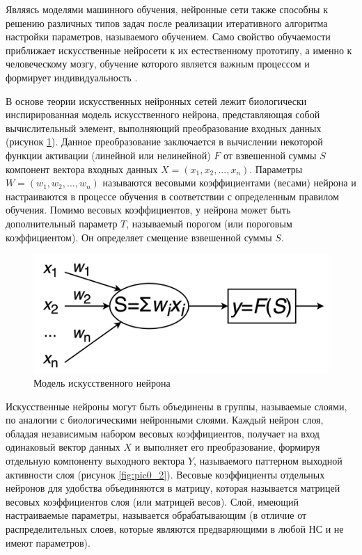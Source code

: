 Являясь моделями машинного обучения, нейронные сети также способны к решению различных типов задач после реализации итеративного алгоритма настройки параметров, называемого обучением. Само свойство обучаемости приближает искусственные нейросети к их естественному прототипу, а именно к человеческому мозгу, обучение которого является важным процессом и формирует индивидуальность \cite[с.~316-317]{kandel}.

В основе теории искусственных нейронных сетей лежит биологически инспирированная модель искусственного нейрона, представляющая собой вычислительный элемент, выполняющий преобразование входных данных (рисунок \ref{fig:pic0_1}). Данное преобразование заключается в вычислении некоторой функции активации (линейной или нелинейной) $F$ от взвешенной суммы $S$ компонент вектора входных данных $X = (x_1, x_2, ..., x_n)$. Параметры $W = (w_1, w_2, ..., w_n)$ называются весовыми коэффициентами (весами) нейрона и настраиваются в процессе обучения в соответствии с определенным правилом обучения. Помимо весовых коэффициентов, у нейрона может быть дополнительный параметр $T$, называемый порогом (или пороговым коэффициентом). Он определяет смещение взвешенной суммы $S$.

\begin{figure}[H]
  \centering
  \includegraphics[width=\textwidth]{man-source/images/ch1/pic0-1.png}
  \caption{Модель искусственного нейрона}
  \label{fig:pic0_1}
\end{figure}

Искусственные нейроны могут быть объединены в группы, называемые слоями, по аналогии с биологическими нейронными слоями. Каждый нейрон слоя, обладая независимым набором весовых коэффициентов, получает на вход одинаковый вектор данных $X$ и выполняет его преобразование, формируя отдельную компоненту выходного вектора $Y$, называемого паттерном выходной активности слоя \cite[c.~27]{golovko2017} (рисунок \ref{fig:pic0_2}). Весовые коэффициенты отдельных нейронов для удобства объединяются в матрицу, которая называется матрицей весовых коэффициентов слоя (или матрицей весов). Слой, имеющий настраиваемые параметры, называется обрабатывающим (в отличие от распределительных слоев, которые являются предваряющими в любой НС и не имеют параметров).

